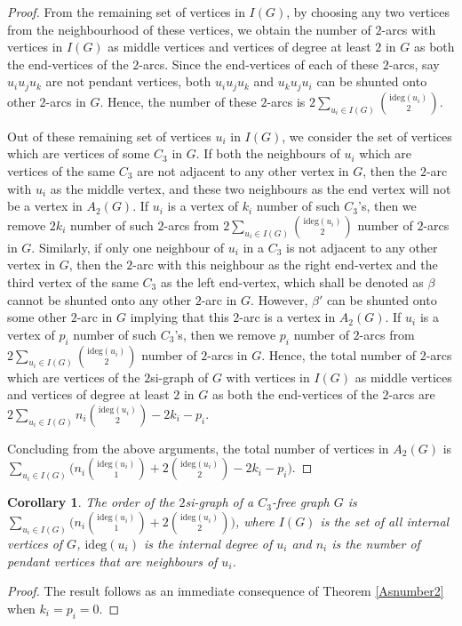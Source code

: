 \documentclass[12pt,a4paper,twoside]{article}
\newcommand{\ideg}[1]{\mathrm{ideg}}
\newtheorem{corollary}[theorem]{Corollary}
\theoremstyle{casesty}
\theoremstyle{subcasesty}
\theoremstyle{schemesty}
\begin{document}
\begin{proof}
	From the remaining set of vertices in $I(G)$, by choosing any two vertices from the neighbourhood of these vertices, we obtain the number of $2$-arcs with vertices in $I(G)$ as middle vertices and vertices of degree at least $2$ in $G$ as both the end-vertices of the $2$-arcs. Since the end-vertices of each of these $2$-arcs, say $u_{i}u_{j}u_{k}$ are not pendant vertices, both $u_{i}u_{j}u_{k}$ and $u_{k}u_{j}u_{i}$ can be shunted onto other $2$-arcs in $G$. Hence, the number of these $2$-arcs is $2\sum\limits_{u_{i} \in I(G)} {\ideg{G}(u_{i}) \choose 2}$.  
	
	Out of these remaining set of vertices $u_{i}$ in $I(G)$, we consider the set of vertices which are vertices of some $C_{3}$ in $G$. If both the neighbours of $u_{i}$ which are vertices of the same $C_{3}$ are not adjacent to any other vertex in $G$, then the $2$-arc with $u_{i}$ as the middle vertex, and these two neighbours as the end vertex will not be a vertex in $A_{2}(G)$. If $u_{i}$ is a vertex of $k_{i}$ number of such $C_{3}$'s, then we remove $2k_{i}$ number of such $2$-arcs from $2\sum\limits_{u_{i} \in I(G)} {\ideg{G}(u_{i}) \choose 2}$ number of $2$-arcs in $G$. Similarly, if only one neighbour of $u_{i}$ in a $C_{3}$ is not adjacent to any other vertex in $G$, then the $2$-arc with this neighbour as the right end-vertex and the third vertex of the same $C_{3}$ as the left end-vertex, which shall be denoted as $\beta$ cannot be shunted onto any other $2$-arc in $G$. However, $\beta'$ can be shunted onto some other $2$-arc in $G$ implying that this $2$-arc is a vertex in $A_{2}(G)$. If $u_{i}$ is a vertex of $p_{i}$ number of such $C_{3}$'s, then we remove $p_{i}$ number of $2$-arcs from $2\sum\limits_{u_{i} \in I(G)} {\ideg{G}(u_{i}) \choose 2}$ number of $2$-arcs in $G$. Hence, the total number of $2$-arcs which are vertices of the $2$si-graph of $G$ with vertices in $I(G)$ as middle vertices and vertices of degree at least $2$ in $G$ as both the end-vertices of the $2$-arcs are $2\sum\limits_{u_{i} \in I(G)} n_{i}{\ideg{G}(u_{i}) \choose 2} - 2k_{i} - p_{i}$. 
	
	Concluding from the above arguments, the total number of vertices in $A_{2}(G)$ is $\sum\limits_{u_{i} \in I(G)} \Big (n_{i}{\ideg{G}(u_{i}) \choose 1} + 2{\ideg{G}(u_{i}) \choose 2} - 2k_{i} - p_{i} \Big )$.
\end{proof}

\begin{corollary} \label{Asnumber22}
	The order of the $2$si-graph of a $C_{3}$-free graph $G$ is $\sum\limits_{u_{i} \in I(G)} \Big (n_{i}{\ideg{G}(u_{i}) \choose 1} + 2{\ideg{G}(u_{i}) \choose 2} \Big )$, where $I(G)$ is the set of all internal vertices of $G$, $\ideg{G}(u_{i})$ is the internal degree of $u_{i}$ and $n_{i}$ is the number of pendant vertices that are neighbours of $u_{i}$.
\end{corollary}
\begin{proof}
	The result follows as an immediate consequence of Theorem \ref{Asnumber2} when $k_{i}=p_{i}=0$.
\end{proof}
\end{document}
